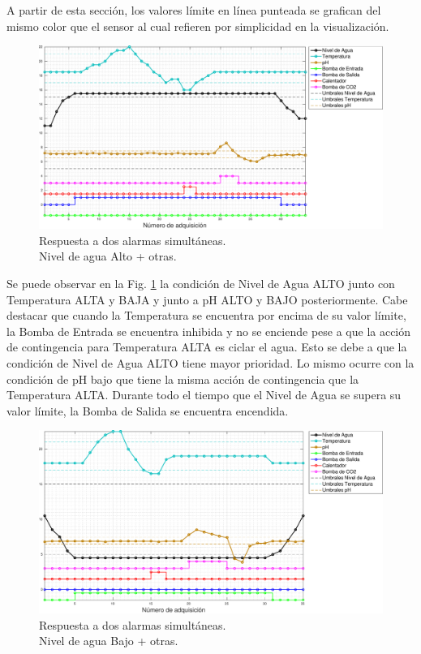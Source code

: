 A partir de esta sección, los valores límite en línea punteada se grafican del mismo color que el sensor al cual refieren por simplicidad en la visualización.

\begin{figure}[h]
\centering
    \includegraphics[width=\textwidth]{./Figures/plot2waterHigh.pdf}
	\caption{Respuesta a dos alarmas simultáneas.\\ Nivel de agua Alto + otras.}
	\label{fig:alarma2WaterHigh}
\end{figure}

Se puede observar en la Fig. \ref{fig:alarma2WaterHigh} la condición de Nivel de Agua ALTO junto con Temperatura ALTA y BAJA y junto a pH ALTO y BAJO posteriormente.  Cabe destacar que cuando la Temperatura se encuentra por encima de su valor límite, la Bomba de Entrada se encuentra inhibida y no se enciende pese a que la acción de contingencia para Temperatura ALTA es ciclar el agua.  Esto se debe a que la condición de Nivel de Agua ALTO tiene mayor prioridad.  Lo mismo ocurre con la condición de pH bajo que tiene la misma acción de contingencia que la Temperatura ALTA.  Durante todo el tiempo que el Nivel de Agua se supera su valor límite, la Bomba de Salida se encuentra encendida.

\begin{figure}
\centering
    \includegraphics[width=\textwidth]{./Figures/plot2waterLow.pdf}
	\caption{Respuesta a dos alarmas simultáneas.\\ Nivel de agua Bajo + otras.}
	\label{fig:alarma2WaterLow}
\end{figure}

